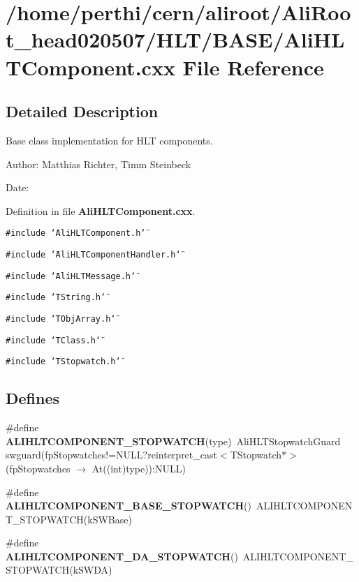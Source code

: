 \section{/home/perthi/cern/aliroot/Ali\-Root\_\-head020507/HLT/BASE/Ali\-HLTComponent.cxx File Reference}
\label{AliHLTComponent_8cxx}


\subsection{Detailed Description}
Base class implementation for HLT components. 

\begin{Desc}
\item[Author:]Matthias Richter, Timm Steinbeck \end{Desc}
\begin{Desc}
\item[Date:]\end{Desc}


Definition in file {\bf Ali\-HLTComponent.cxx}.

{\tt \#include \char`\"{}Ali\-HLTComponent.h\char`\"{}}\par
{\tt \#include \char`\"{}Ali\-HLTComponent\-Handler.h\char`\"{}}\par
{\tt \#include \char`\"{}Ali\-HLTMessage.h\char`\"{}}\par
{\tt \#include \char`\"{}TString.h\char`\"{}}\par
{\tt \#include \char`\"{}TObj\-Array.h\char`\"{}}\par
{\tt \#include \char`\"{}TClass.h\char`\"{}}\par
{\tt \#include \char`\"{}TStopwatch.h\char`\"{}}\par
\subsection*{Defines}
\begin{CompactItemize}
\item 
\#define {\bf ALIHLTCOMPONENT\_\-STOPWATCH}(type)\ Ali\-HLTStopwatch\-Guard swguard(fp\-Stopwatches!=NULL?reinterpret\_\-cast$<$TStopwatch$\ast$$>$(fp\-Stopwatches $\rightarrow$ At((int)type)):NULL)
\item 
\#define {\bf ALIHLTCOMPONENT\_\-BASE\_\-STOPWATCH}()\ ALIHLTCOMPONENT\_\-STOPWATCH(k\-SWBase)
\item 
\#define {\bf ALIHLTCOMPONENT\_\-DA\_\-STOPWATCH}()\ ALIHLTCOMPONENT\_\-STOPWATCH(k\-SWDA)
\end{CompactItemize}
